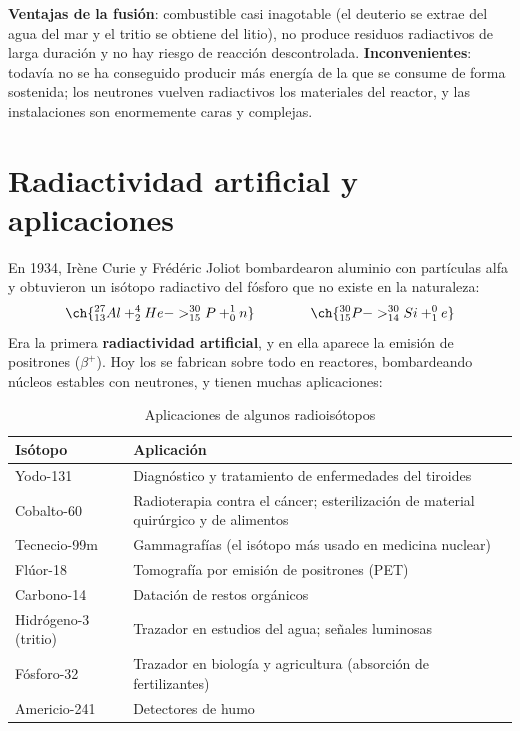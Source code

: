 \begin{remark}
    \textbf{Ventajas de la fusión}: combustible casi inagotable (el deuterio se extrae del agua del mar y el tritio se obtiene del litio),
    no produce residuos radiactivos de larga duración y no hay riesgo de reacción descontrolada. \textbf{Inconvenientes}: todavía no se ha
    conseguido producir más energía de la que se consume de forma sostenida; los neutrones vuelven radiactivos los materiales del reactor,
    y las instalaciones son enormemente caras y complejas.
\end{remark}

\section{Radiactividad artificial y aplicaciones}\label{sec:nuc-aplicaciones}

En 1934, Irène Curie y Frédéric Joliot bombardearon aluminio con partículas alfa y obtuvieron un isótopo radiactivo del fósforo que no
existe en la naturaleza:
\[ \ch{^{27}_{13}Al + ^4_2He -> ^{30}_{15}P + ^1_0n} \qquad\qquad \ch{^{30}_{15}P -> ^{30}_{14}Si + ^0_{1}e} \]
Era la primera \textbf{radiactividad artificial}, y en ella aparece la emisión de positrones (\(\beta^+\)). Hoy los
 se fabrican sobre todo en reactores, bombardeando núcleos estables con neutrones, y tienen muchas aplicaciones:

\begin{table}[H]
    \centering
    \caption{Aplicaciones de algunos radioisótopos}
    \vspace{-5pt}
    \begin{tabular}{@{}lL{10.4cm}@{}}
        \toprule
        \textbf{Isótopo} & \textbf{Aplicación} \\
        \midrule
        Yodo-131 & Diagnóstico y tratamiento de enfermedades del tiroides \\[3pt]
        Cobalto-60 & Radioterapia contra el cáncer; esterilización de material quirúrgico y de alimentos \\[3pt]
        Tecnecio-99m & Gammagrafías (el isótopo más usado en medicina nuclear) \\[3pt]
        Flúor-18 & Tomografía por emisión de positrones (PET) \\[3pt]
        Carbono-14 & Datación de restos orgánicos \\[3pt]
        Hidrógeno-3 (tritio) & Trazador en estudios del agua; señales luminosas \\[3pt]
        Fósforo-32 & Trazador en biología y agricultura (absorción de fertilizantes) \\[3pt]
        Americio-241 & Detectores de humo \\
        \bottomrule
    \end{tabular}
    \label{tab:nuc-aplicaciones}
\end{table}

